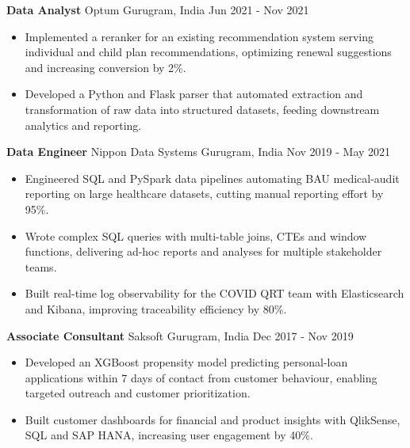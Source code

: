 \documentclass[10pt,a4paper]{article}
\newcommand{\role}[4]{\textbf{#1} \textbar{} #2 \hfill #3 \textbar{} #4\par}
\begin{document}
\vspace{3pt}
\role{Data Analyst}{Optum}{Gurugram, India}{Jun 2021 - Nov 2021}
\begin{itemize}
  \item Implemented a reranker for an existing recommendation system serving individual and child plan recommendations, optimizing renewal suggestions and increasing conversion by 2\%.
  \item Developed a Python and Flask parser that automated extraction and transformation of raw data into structured datasets, feeding downstream analytics and reporting.
\end{itemize}
\vspace{3pt}
\role{Data Engineer}{Nippon Data Systems}{Gurugram, India}{Nov 2019 - May 2021}
\begin{itemize}
  \item Engineered SQL and PySpark data pipelines automating BAU medical-audit reporting on large healthcare datasets, cutting manual reporting effort by 95\%.
  \item Wrote complex SQL queries with multi-table joins, CTEs and window functions, delivering ad-hoc reports and analyses for multiple stakeholder teams.
  \item Built real-time log observability for the COVID QRT team with Elasticsearch and Kibana, improving traceability efficiency by 80\%.
\end{itemize}
\vspace{3pt}
\role{Associate Consultant}{Saksoft}{Gurugram, India}{Dec 2017 - Nov 2019}
\begin{itemize}
  \item Developed an XGBoost propensity model predicting personal-loan applications within 7 days of contact from customer behaviour, enabling targeted outreach and customer prioritization.
  \item Built customer dashboards for financial and product insights with QlikSense, SQL and SAP HANA, increasing user engagement by 40\%.
\end{itemize}
\end{document}
